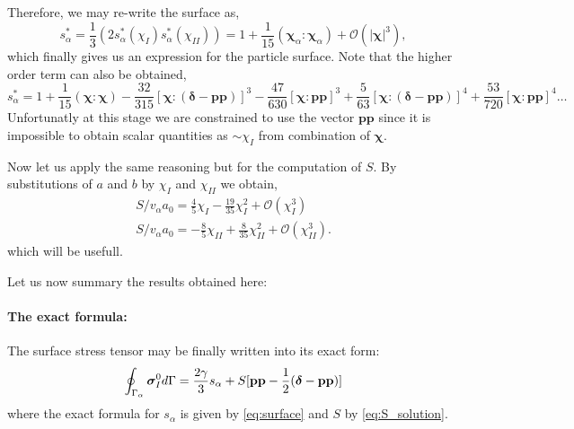 Therefore, we may re-write the surface as, 
\begin{equation*}
    s_\alpha^* 
    = \frac{1}{3}\left(
        2 s_\alpha^*(\chi_I)
        s_\alpha^*(\chi_{II})
    \right)
    = 
    1 + \frac{1}{15} (\bm\chi_\alpha:\bm\chi_\alpha)
    + \mathcal{O}(|\bm\chi|^3),
\end{equation*}
which finally gives us an expression for the particle surface. 
Note that the higher order term can also be obtained, 
\begin{equation*}
    s_\alpha^* 
    = 
    1 + \frac{1}{15} (\bm\chi:\bm\chi)
    - \frac{32}{315} [\bm\chi : (\bm\delta - \textbf{pp})]^3
    - \frac{47}{630} [\bm\chi : \textbf{pp}]^3
    + \frac{5}{63} [\bm\chi : (\bm\delta - \textbf{pp})]^4
    + \frac{53}{720} [\bm\chi : \textbf{pp}]^4
    \ldots
\end{equation*}
Unfortunatly at this stage we are constrained  to use the vector $\textbf{pp}$ since it is impossible to obtain scalar quantities as $\sim \chi_I$ from combination of $\bm\chi$. 

Now let us  apply the same reasoning but for the computation of $S$. 
By substitutions of $a$ and $b$ by $\chi_I$ and $\chi_{II}$ we obtain,
\begin{align*}
    S / v_\alpha a_0 =  \frac{4}{5} \chi_I - \frac{19}{35}\chi_I^2 +\mathcal{O}(\chi_I^3)\\
    S / v_\alpha a_0 =  - \frac{8}{5} \chi_{II} + \frac{8}{35}\chi_{II}^2+\mathcal{O}(\chi_{II}^3). 
    \label{eq:taylor_exp_S}
\end{align*}
which will be usefull. 



Let us now summary the results obtained here: 

\paragraph{The exact formula: }
The surface stress tensor may be finally written into its exact form: 
\begin{equation*}
    \oint_{\Gamma_{\alpha}} \bm\sigma_I^0 d\Gamma
    = \frac{2\gamma}{3}s_\alpha 
    + S[\textbf{pp} - \frac{1}{2}(\bm\delta - \textbf{pp})]
    \label{eq:exact_solution}
\end{equation*}
where the exact formula for $s_\alpha$ is given by \ref{eq:surface} and $S$ by \ref{eq:S_solution}.  

